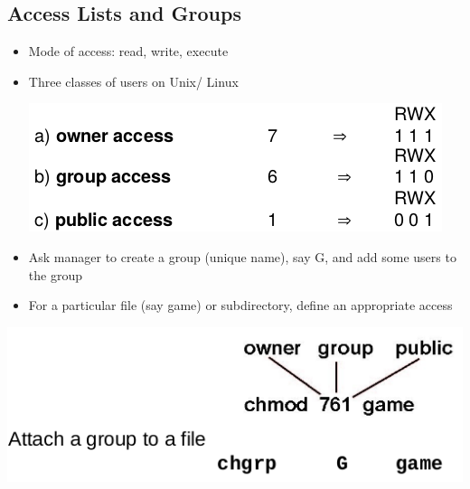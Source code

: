 \documentclass{article}[18pt]
\begin{document}
\subsection{Access Lists and Groups}
\begin{itemize}
	\item Mode of access: read, write, execute
	\item Three classes of users on Unix/ Linux
	\begin{center}
		\includegraphics[scale=0.7]{users}
	\end{center}
	\item Ask manager to create a group (unique name), say G, and add some users to the group
	\item For a particular file (say game) or subdirectory, define an appropriate access
\end{itemize}
\begin{center}
	\includegraphics[scale=0.7]{group}
\end{center}
\end{document}
